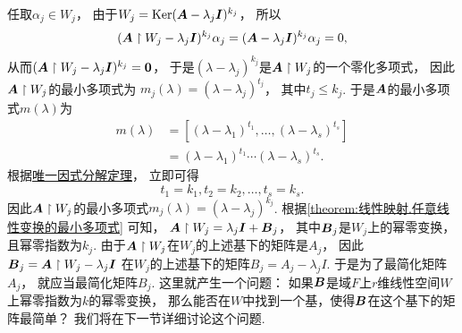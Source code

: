 任取\(\alpha_j \in W_j\)，
由于\(W_j = \operatorname{Ker}(\boldsymbol{A} - \lambda_j \boldsymbol{I})^{k_j}\)，
所以\begin{equation*}
	(\boldsymbol{A} \upharpoonright W_j - \lambda_j \boldsymbol{I})^{k_j} \alpha_j
	= (\boldsymbol{A} - \lambda_j \boldsymbol{I})^{k_j} \alpha_j
	= 0,
\end{equation*}
从而\((\boldsymbol{A} \upharpoonright W_j - \lambda_j \boldsymbol{I})^{k_j} = \boldsymbol0\)，
于是\((\lambda-\lambda_j)^{k_j}\)是\(\boldsymbol{A} \upharpoonright W_j\)的一个零化多项式，
因此\(\boldsymbol{A} \upharpoonright W_j\)的最小多项式为
\(m_j(\lambda) = (\lambda-\lambda_j)^{t_j}\)，
其中\(t_j \leq k_j\).
于是\(\boldsymbol{A}\)的最小多项式\(m(\lambda)\)为\begin{align*}
	m(\lambda)
	&= [(\lambda-\lambda_1)^{t_1},\dotsc,(\lambda-\lambda_s)^{t_s}] \\
	&= (\lambda-\lambda_1)^{t_1} \dotsm (\lambda-\lambda_s)^{t_s}.
\end{align*}
根据\hyperref[theorem:多项式.唯一因式分解定理]{唯一因式分解定理}，
立即可得\begin{equation*}
	t_1 = k_1,
	t_2 = k_2,
	\dotsc,
	t_s = k_s.
\end{equation*}
因此\(\boldsymbol{A} \upharpoonright W_j\)的最小多项式\(m_j(\lambda) = (\lambda-\lambda_j)^{k_j}\).
根据\cref{theorem:线性映射.任意线性变换的最小多项式} 可知，
\(\boldsymbol{A} \upharpoonright W_j = \lambda_j \boldsymbol{I} + \boldsymbol{B}_j\)，
其中\(\boldsymbol{B}_j\)是\(W_j\)上的幂零变换，且幂零指数为\(k_j\).
由于\(\boldsymbol{A} \upharpoonright W_j\)在\(W_j\)的上述基下的矩阵是\(A_j\)，
因此\(\boldsymbol{B}_j = \boldsymbol{A} \upharpoonright W_j - \lambda_j \boldsymbol{I}\)
在\(W_j\)的上述基下的矩阵\(B_j = A_j - \lambda_j I\).
于是为了最简化矩阵\(A_j\)，
就应当最简化矩阵\(B_j\).
这里就产生一个问题：
如果\(\boldsymbol{B}\)是域\(F\)上\(r\)维线性空间\(W\)上幂零指数为\(k\)的幂零变换，
那么能否在\(W\)中找到一个基，使得\(\boldsymbol{B}\)在这个基下的矩阵最简单？
我们将在下一节详细讨论这个问题.
